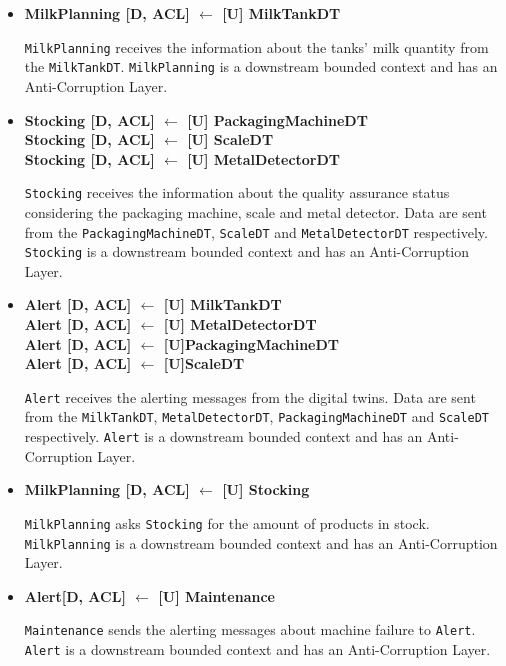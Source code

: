 \begin{itemize}
    \item \textbf{MilkPlanning [D, ACL] $\leftarrow$ [U] MilkTankDT}
    
    \texttt{MilkPlanning} receives the information about the tanks' milk quantity from the \texttt{MilkTankDT}.
    \texttt{MilkPlanning} is a downstream bounded context and has an Anti-Corruption Layer.
    
    \item \textbf{Stocking [D, ACL] $\leftarrow$ [U] PackagingMachineDT \\ 
    Stocking [D, ACL] $\leftarrow$ [U] ScaleDT \\ 
    Stocking [D, ACL] $\leftarrow$ [U] MetalDetectorDT}

    \texttt{Stocking} receives the information about the quality assurance status considering the packaging machine, scale and metal detector. Data are sent from the \texttt{PackagingMachineDT}, \texttt{ScaleDT} and \texttt{MetalDetectorDT} respectively.
    \texttt{Stocking} is a downstream bounded context and has an Anti-Corruption Layer.
	
	\item \textbf{Alert [D, ACL] $\leftarrow$ [U] MilkTankDT \\
	Alert [D, ACL] $\leftarrow$ [U] MetalDetectorDT \\
	Alert [D, ACL] $\leftarrow$ [U]PackagingMachineDT \\
	Alert [D, ACL] $\leftarrow$ [U]ScaleDT}

    \texttt{Alert} receives the alerting messages from the digital twins. Data are sent from the \texttt{MilkTankDT}, \texttt{MetalDetectorDT}, \texttt{PackagingMachineDT} and \texttt{ScaleDT} respectively.
    \texttt{Alert} is a downstream bounded context and has an Anti-Corruption Layer.

    \item \textbf{MilkPlanning [D, ACL] $\leftarrow$  [U] Stocking} 
    
    \texttt{MilkPlanning} asks \texttt{Stocking} for the amount of products in stock.
    \texttt{MilkPlanning} is a downstream bounded context and has an Anti-Corruption Layer.

    \item \textbf{Alert[D, ACL] $\leftarrow$  [U] Maintenance}
    
    \texttt{Maintenance} sends the alerting messages about machine failure to \texttt{Alert}.
    \texttt{Alert} is a downstream bounded context and has an Anti-Corruption Layer.


\end{itemize}
